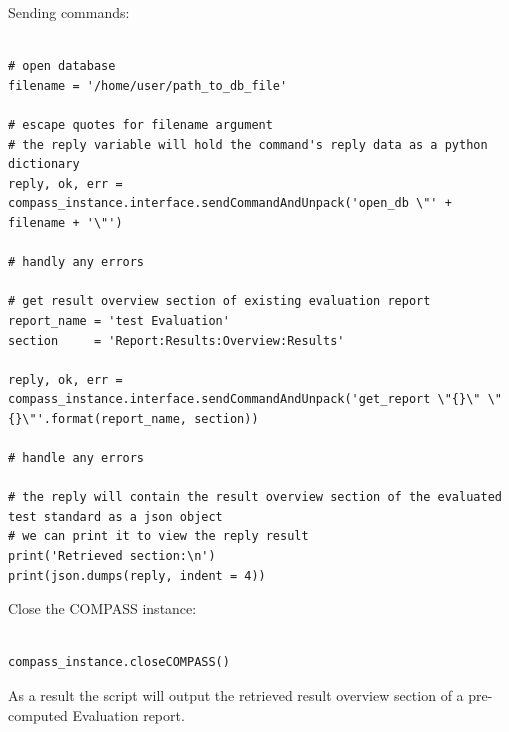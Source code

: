 Sending commands:

\begin{lstlisting}[basicstyle=\tiny\ttfamily]

# open database
filename = '/home/user/path_to_db_file'

# escape quotes for filename argument
# the reply variable will hold the command's reply data as a python dictionary
reply, ok, err = compass_instance.interface.sendCommandAndUnpack('open_db \"' + filename + '\"')

# handly any errors 

# get result overview section of existing evaluation report
report_name = 'test Evaluation'
section     = 'Report:Results:Overview:Results'

reply, ok, err = compass_instance.interface.sendCommandAndUnpack('get_report \"{}\" \"{}\"'.format(report_name, section))

# handle any errors 

# the reply will contain the result overview section of the evaluated test standard as a json object
# we can print it to view the reply result
print('Retrieved section:\n')
print(json.dumps(reply, indent = 4))

\end{lstlisting}

Close the COMPASS instance:

\begin{lstlisting}[basicstyle=\tiny\ttfamily]

compass_instance.closeCOMPASS()

\end{lstlisting}

As a result the script will output the retrieved result overview section of a pre-computed Evaluation report.

